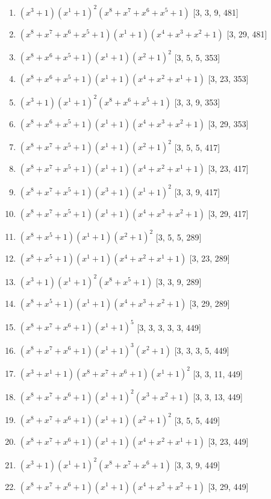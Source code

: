 \documentclass[10pt,twocolumn]{article}
\begin{document}
\begin{enumerate}
\item $(x^{3} + 1)(x^{1} + 1)^{2}(x^{8} + x^{7} + x^{6} + x^{5} + 1)$  [3, 3, 9, 481]
\item $(x^{8} + x^{7} + x^{6} + x^{5} + 1)(x^{1} + 1)(x^{4} + x^{3} + x^{2} + 1)$  [3, 29, 481]
\item $(x^{8} + x^{6} + x^{5} + 1)(x^{1} + 1)(x^{2} + 1)^{2}$  [3, 5, 5, 353]
\item $(x^{8} + x^{6} + x^{5} + 1)(x^{1} + 1)(x^{4} + x^{2} + x^{1} + 1)$  [3, 23, 353]
\item $(x^{3} + 1)(x^{1} + 1)^{2}(x^{8} + x^{6} + x^{5} + 1)$  [3, 3, 9, 353]
\item $(x^{8} + x^{6} + x^{5} + 1)(x^{1} + 1)(x^{4} + x^{3} + x^{2} + 1)$  [3, 29, 353]
\item $(x^{8} + x^{7} + x^{5} + 1)(x^{1} + 1)(x^{2} + 1)^{2}$  [3, 5, 5, 417]
\item $(x^{8} + x^{7} + x^{5} + 1)(x^{1} + 1)(x^{4} + x^{2} + x^{1} + 1)$  [3, 23, 417]
\item $(x^{8} + x^{7} + x^{5} + 1)(x^{3} + 1)(x^{1} + 1)^{2}$  [3, 3, 9, 417]
\item $(x^{8} + x^{7} + x^{5} + 1)(x^{1} + 1)(x^{4} + x^{3} + x^{2} + 1)$  [3, 29, 417]
\item $(x^{8} + x^{5} + 1)(x^{1} + 1)(x^{2} + 1)^{2}$  [3, 5, 5, 289]
\item $(x^{8} + x^{5} + 1)(x^{1} + 1)(x^{4} + x^{2} + x^{1} + 1)$  [3, 23, 289]
\item $(x^{3} + 1)(x^{1} + 1)^{2}(x^{8} + x^{5} + 1)$  [3, 3, 9, 289]
\item $(x^{8} + x^{5} + 1)(x^{1} + 1)(x^{4} + x^{3} + x^{2} + 1)$  [3, 29, 289]
\item $(x^{8} + x^{7} + x^{6} + 1)(x^{1} + 1)^{5}$  [3, 3, 3, 3, 3, 449]
\item $(x^{8} + x^{7} + x^{6} + 1)(x^{1} + 1)^{3}(x^{2} + 1)$  [3, 3, 3, 5, 449]
\item $(x^{3} + x^{1} + 1)(x^{8} + x^{7} + x^{6} + 1)(x^{1} + 1)^{2}$  [3, 3, 11, 449]
\item $(x^{8} + x^{7} + x^{6} + 1)(x^{1} + 1)^{2}(x^{3} + x^{2} + 1)$  [3, 3, 13, 449]
\item $(x^{8} + x^{7} + x^{6} + 1)(x^{1} + 1)(x^{2} + 1)^{2}$  [3, 5, 5, 449]
\item $(x^{8} + x^{7} + x^{6} + 1)(x^{1} + 1)(x^{4} + x^{2} + x^{1} + 1)$  [3, 23, 449]
\item $(x^{3} + 1)(x^{1} + 1)^{2}(x^{8} + x^{7} + x^{6} + 1)$  [3, 3, 9, 449]
\item $(x^{8} + x^{7} + x^{6} + 1)(x^{1} + 1)(x^{4} + x^{3} + x^{2} + 1)$  [3, 29, 449]

\end{enumerate}
\end{document}

